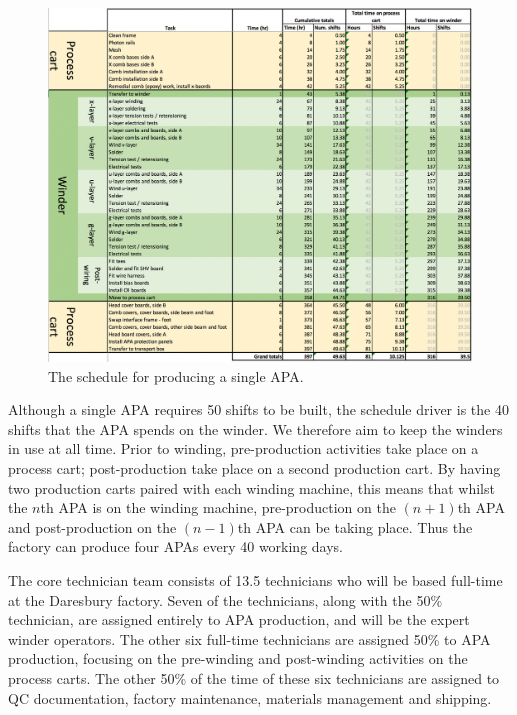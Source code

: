 \begin{figure}
    \centering
    \includegraphics[angle=90,origin=c,width=\textwidth]{figs/WP3/FactorySchedule.png}
    \caption{The schedule for producing a single APA.}
    \label{fig:FactorySchedule}
\end{figure}

Although a single APA requires 50 shifts to be built, the schedule driver is the 40 shifts that the APA spends on the winder. We therefore aim to keep the winders in use at all time. Prior to winding, pre-production activities take place on a process cart; post-production take place on a second production cart. By having two production carts paired with each winding machine, this means that whilst the $n$th APA is on the winding machine, pre-production on the $(n+1)$th APA and post-production on the $(n-1)$th APA can be taking place. Thus the factory can produce four APAs every 40 working days.

The core technician team consists of 13.5 technicians who will be based full-time at the Daresbury factory. Seven of the technicians, along with the 50\% technician, are assigned entirely to APA production, and will be the expert winder operators. The other six full-time technicians are assigned 50\% to APA production, focusing on the pre-winding and post-winding activities on the process carts. The other 50\% of the time of these six technicians are assigned to QC documentation, factory maintenance, materials management and shipping.


